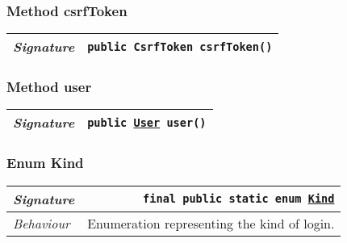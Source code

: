 \begin{adjustwidth}{1.5em}{0pt}
\begin{adjustwidth}{1.5em}{0pt}
\begin{adjustwidth}{1.5em}{0pt}
{\begin{tabularx}{1.0\linewidth}{@{}l R@{}}
      \end{tabularx}}
    \end{adjustwidth}\subsubsection{Method csrfToken\label{edu.kit.hci.soli.dto.LoginStateModel@csrfToken()}}
    \begin{adjustwidth}{1.5em}{0pt}
      {\begin{tabularx}{1.0\linewidth}{@{}l R@{}}
        \emph{Signature} & \texttt{public \texttt{CsrfToken} csrfToken()} \\
        \hline
  
      \end{tabularx}}
    \end{adjustwidth}\subsubsection{Method user\label{edu.kit.hci.soli.dto.LoginStateModel@user()}}
    \begin{adjustwidth}{1.5em}{0pt}
      {\begin{tabularx}{1.0\linewidth}{@{}l R@{}}
        \emph{Signature} & \texttt{public \texttt{\hyperref[edu.kit.hci.soli.domain.User]{\texttt{User}}} user()} \\
        \hline
  
      \end{tabularx}}
    \end{adjustwidth}\subsubsection{Enum Kind\label{edu.kit.hci.soli.dto.LoginStateModel.Kind} }
    \begin{adjustwidth}{1.5em}{0pt}
      {\begin{tabularx}{1.0\linewidth}{@{}l R@{}}
        \emph{Signature} & \texttt{final public static  enum \texttt{\hyperref[edu.kit.hci.soli.dto.LoginStateModel.Kind]{\texttt{Kind}}}} \\
        \hline
        \emph{Behaviour} & Enumeration representing the kind of login.  \\
        \hline
  
      \end{tabularx}}
    \end{adjustwidth}
  \end{adjustwidth}
\end{adjustwidth}